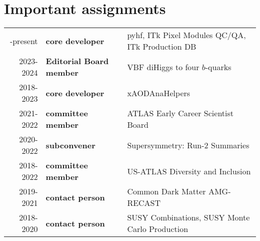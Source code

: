\vspace{-4.5em}\section{Important assignments}
 {
  \footnotesize
  \begin{tabular}{r|>{\bfseries}ll}
	  \centering
	  2018-present & core developer         & pyhf, ITk Pixel Modules QC/QA, ITk Production DB \\
	  2023-2024    & Editorial Board member & VBF diHiggs to four $b$-quarks                   \\
	  2018-2023    & core developer         & xAODAnaHelpers                                   \\
	  2021-2022    & committee member       & ATLAS Early Career Scientist Board               \\
	  2020-2022    & subconvener            & Supersymmetry: Run-2 Summaries                   \\
	  2018-2022    & committee member       & US-ATLAS Diversity and Inclusion                 \\
	  2019-2021    & contact person         & Common Dark Matter AMG-RECAST                    \\
	  2018-2020    & contact person         & SUSY Combinations, SUSY Monte Carlo Production   \\
  \end{tabular}
 }


